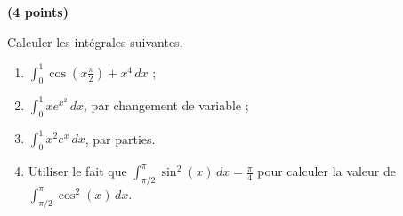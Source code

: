 \begin{exercice}\label{exoExosenvrac-0009}\textbf{ (4 points) }
  
  Calculer les intégrales suivantes.
  \begin{enumerate}
  \item $\displaystyle \int_0^1 \cos\left(x\frac{\pi}{2}\right) + x^4 \, dx $ ; 
  \item $\displaystyle \int_{0}^1 xe^{x^2} \, dx $, par changement de variable ; 
  \item $\displaystyle \int_{0}^1 x^2e^{x} \, dx $, par parties. 
  \item Utiliser le fait que $\displaystyle  \int_{\pi/2}^{\pi} \sin^2(x)\, dx=\frac{\pi}{4} $ pour calculer la valeur de $\displaystyle \int_{\pi/2}^{\pi} \cos^2(x)\, dx$.
  \end{enumerate}


\end{exercice}
